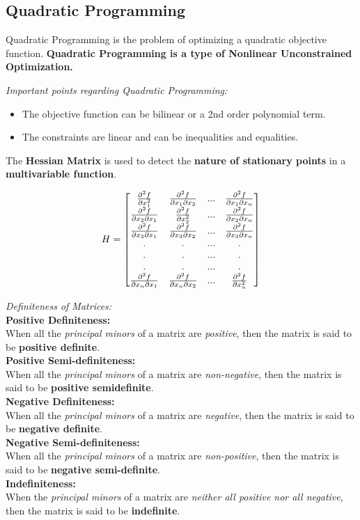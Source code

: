 \documentclass[12pt, letterpaper]{article}
\begin{document}
\subsection{Quadratic Programming}
Quadratic Programming is the problem of optimizing a quadratic objective function.
\textbf{Quadratic Programming is a type of Nonlinear Unconstrained Optimization.}

\emph{Important points regarding Quadratic Programming:}
\begin{itemize}
    \item The objective function can be bilinear or a 2nd order polynomial term.
    \item The constraints are linear and can be inequalities and equalities.
\end{itemize}

The \textbf{Hessian Matrix} is used to detect the \textbf{nature of stationary points} in a \textbf{multivariable function}.

\begin{equation}
H =
\begin{bmatrix}
\pdv[2]{f}{x_1} & \pdv{f}{x_1}{x_2} & ... & \pdv{f}{x_1}{x_n}\\
\pdv{f}{x_2}{x_1} & \pdv[2]{f}{x_2} & ... & \pdv{f}{x_2}{x_n}\\
\pdv{f}{x_3}{x_1} & \pdv{f}{x_3}{x_2} & ... & \pdv{f}{x_3}{x_n}\\
. & . & ... & .\\
. & . & ... & .\\
. & . & ... & .\\
\pdv{f}{x_n}{x_1} & \pdv{f}{x_n}{x_2} & ... & \pdv[2]{f}{x_n}\\
\end{bmatrix}
\end{equation}

\emph{Definiteness of Matrices:} \\
\textbf{Positive Definiteness:} \\ 
When all the \textit{principal minors} of a matrix are \textit{positive}, then the matrix is said to be \textbf{positive definite}. \\
\textbf{Positive Semi-definiteness:}  \\
When all the \textit{principal minors} of a matrix are \textit{non-negative}, then the matrix is said to be \textbf{positive semidefinite}. \\
\textbf{Negative Definiteness: }  \\
When all the \textit{principal minors} of a matrix are \textit{negative}, then the matrix is said to be \textbf{negative definite}. \\
\textbf{Negative Semi-definiteness:}  \\
When all the \textit{principal minors} of a matrix are \textit{non-positive}, then the matrix is said to be \textbf{negative semi-definite}.\\
\textbf{Indefiniteness:}  \\
When the \textit{principal minors} of a matrix are \textit{neither all positive nor all negative}, then the matrix is said to be \textbf{indefinite}.\\
\end{document}
